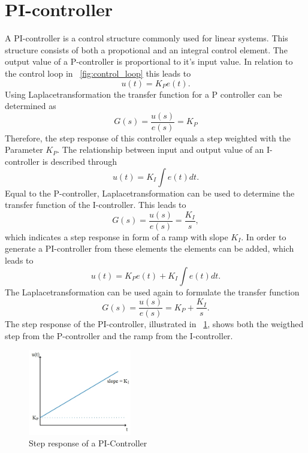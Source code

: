 \section{PI-controller}
A PI-controller is a control structure commonly used for linear systems. This structure consists of both a propotional and an integral control element.
The output value of a P-controller is proportional to it's input value. In relation to the control loop in \figurename~\ref{fig:control_loop} this leads to
\begin{equation}
    u(t) = K_{P}e(t).
 \label{eq:p_contr_1}
\end{equation}
Using Laplacetransformation the transfer function for a P controller can be determined as
\begin{equation}
    G(s) = \frac{u(s)}{e(s)} = K_{P}
 \label{eq:p_contr_2}
\end{equation}
Therefore, the step response of this controller equals a step weighted with the Parameter $K_{P}$.
The relationship between input and output value of an I-controller is described through
\begin{equation}
    u(t) = K_{I}\int e(t) dt.
 \label{eq:i_contr_1}
\end{equation}
Equal to the P-controller, Laplacetransformation can be used to determine the transfer function of the I-controller.
This leads to
\begin{equation}
    G(s) = \frac{u(s)}{e(s)} = \frac{K_{I}}{s},
 \label{eq:i_contr_2}
\end{equation}
which indicates a step response in form of a ramp with slope $K_{I}$.
In order to generate a PI-controller from these elements the elements can be added, which leads to
\begin{equation}
    u(t) = K_{P}e(t) + K_{I}\int e(t) dt.
 \label{eq:pi_contr_1}
\end{equation}
The Laplacetransformation can be used again to formulate the transfer function
\begin{equation}
    G(s) = \frac{u(s)}{e(s)} =  K_{P} + \frac{K_{I}}{s}.
 \label{eq:pi_contr_2}
\end{equation}
The step response of the PI-controller, illustrated in \figurename~\ref{fig:step_resp_pi}, shows both the weigthed step from the P-controller and the ramp from the I-controller.

\begin{figure}[h]
   \centering
   \includegraphics[width=0.4\textwidth]{images/step_resp_pi.jpg}
   \caption[Step response of a PI-Controller]{Step response of a PI-Controller}
   \label{fig:step_resp_pi}
 \end{figure}

